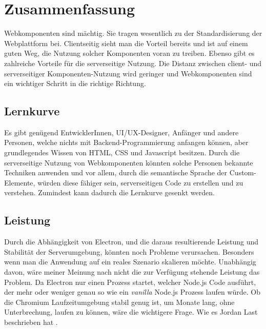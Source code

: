 \chapter{Zusammenfassung}
Webkomponenten sind mächtig. Sie tragen wesentlich zu der Standardisierung der Webplattform bei. Clientseitig sieht man die Vorteil bereits und ist auf einem guten Weg, die Nutzung solcher Komponenten voran zu treiben. Ebenso gibt es zahlreiche Vorteile für die serverseitige Nutzung. Die Distanz zwischen client- und serverseitiger Komponenten-Nutzung wird geringer und Webkomponenten sind ein wichtiger Schritt in die richtige Richtung.

\section{Lernkurve}
Es gibt genügend EntwicklerInnen, UI/UX-Designer, Anfänger und andere Personen, welche nichts mit Backend-Programmierung anfangen können, aber grundlegendes Wissen von HTML, CSS und Javascript besitzen. Durch die serverseitige Nutzung von Webkomponenten könnten solche Personen bekannte Techniken anwenden und vor allem, durch die semantische Sprache der Custom-Elemente, würden diese fähiger sein, serverseitigen Code zu erstellen und zu verstehen. Zumindest kann dadurch die Lernkurve gesenkt werden.    

\section{Leistung}
Durch die Abhängigkeit von Electron, und die daraus resultierende Leistung und Stabilität der Serverumgebung, könnten noch Probleme verursachen. Besonders wenn man die Anwendung auf ein reales Szenario skalieren möchte. Unabhängig davon, wäre meiner Meinung nach nicht die zur Verfügung stehende Leistung das Problem. Da Electron nur einen Prozess startet, welcher Node.js Code ausführt, der mehr oder weniger genau so wie ein \textit{vanilla} Node.js Prozess laufen würde. Ob die Chromium Laufzeitumgebung stabil genug ist, um Monate lang, ohne Unterbrechung, laufen zu können, wäre die wichtigere Frage. Wie es Jordan Last beschrieben hat \cite{server-side-webcomponents}.

